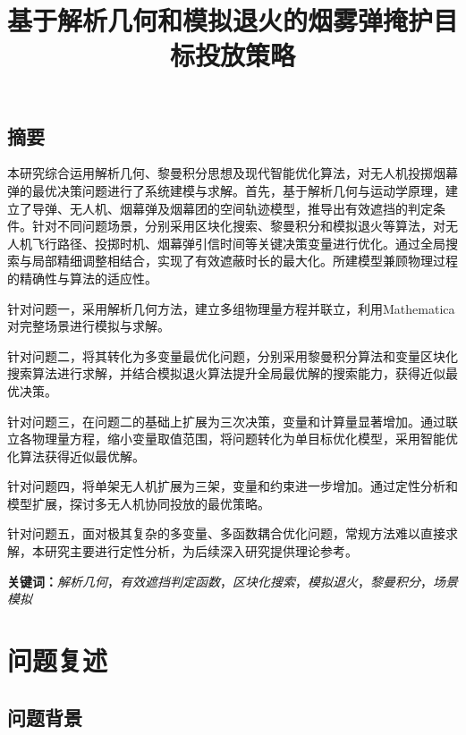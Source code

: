 \documentclass{article}
\title{\large 基于解析几何和模拟退火的烟雾弹掩护目标投放策略}
\date{}
\begin{document}
\maketitle
\begin{center}
\section*{摘要}
\end{center}
\vspace{-1em}


\noindent

本研究综合运用解析几何、黎曼积分思想及现代智能优化算法，对无人机投掷烟幕弹的最优决策问题进行了系统建模与求解。首先，基于解析几何与运动学原理，建立了导弹、无人机、烟幕弹及烟幕团的空间轨迹模型，推导出有效遮挡的判定条件。针对不同问题场景，分别采用区块化搜索、黎曼积分和模拟退火等算法，对无人机飞行路径、投掷时机、烟幕弹引信时间等关键决策变量进行优化。通过全局搜索与局部精细调整相结合，实现了有效遮蔽时长的最大化。所建模型兼顾物理过程的精确性与算法的适应性。

针对问题一，采用解析几何方法，建立多组物理量方程并联立，利用Mathematica对完整场景进行模拟与求解。

针对问题二，将其转化为多变量最优化问题，分别采用黎曼积分算法和变量区块化搜索算法进行求解，并结合模拟退火算法提升全局最优解的搜索能力，获得近似最优决策。

针对问题三，在问题二的基础上扩展为三次决策，变量和计算量显著增加。通过联立各物理量方程，缩小变量取值范围，将问题转化为单目标优化模型，采用智能优化算法获得近似最优解。

针对问题四，将单架无人机扩展为三架，变量和约束进一步增加。通过定性分析和模型扩展，探讨多无人机协同投放的最优策略。

针对问题五，面对极其复杂的多变量、多函数耦合优化问题，常规方法难以直接求解，本研究主要进行定性分析，为后续深入研究提供理论参考。
\noindent

\textbf{关键词：}\textit{解析几何}，\textit{有效遮挡判定函数}，\textit{区块化搜索}，\textit{模拟退火}，\textit{黎曼积分}，\textit{场景模拟}



\section{问题复述}

\subsection{问题背景}
\end{document}
